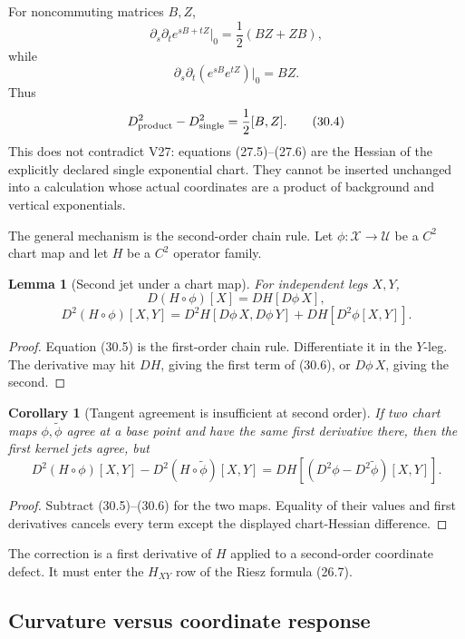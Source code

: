 \documentclass[11pt]{article}
\newtheorem{lemma}[theorem]{Lemma}
\newtheorem{corollary}[theorem]{Corollary}
\begin{document}
For noncommuting matrices \(B,Z\),
\[
 \partial_s\partial_t e^{sB+tZ}\big|_{0}
 =\frac12(BZ+ZB),
 \tag{30.2}
\]
while
\[
 \partial_s\partial_t
 \left(e^{sB}e^{tZ}\right)\big|_{0}
 =BZ.
 \tag{30.3}
\]
Thus
\[
 D^2_{\rm product}-D^2_{\rm single}
 =\frac12[B,Z].
 \tag{30.4}
\]
This does not contradict V27: equations (27.5)--(27.6) are the Hessian
of the explicitly declared single exponential chart.  They cannot be
inserted unchanged into a calculation whose actual coordinates are a
product of background and vertical exponentials.

The general mechanism is the second-order chain rule.  Let
\(\phi:\mathcal X\to\mathcal U\) be a \(C^2\) chart map and let \(H\) be
a \(C^2\) operator family.

\begin{lemma}[Second jet under a chart map]
\label{lem:v11v30-chain}
For independent legs \(X,Y\),
\[
 D(H\circ\phi)[X]
 =
 DH[D\phi\,X],
 \tag{30.5}
\]
\[
 D^2(H\circ\phi)[X,Y]
 =
 D^2H[D\phi\,X,D\phi\,Y]
 +DH[D^2\phi[X,Y]].
 \tag{30.6}
\]
\end{lemma}

\begin{proof}
Equation (30.5) is the first-order chain rule.  Differentiate it in the
\(Y\)-leg.  The derivative may hit \(DH\), giving the first term of
(30.6), or \(D\phi\,X\), giving the second.
\end{proof}

\begin{corollary}[Tangent agreement is insufficient at second order]
\label{cor:v11v30-second-order}
If two chart maps \(\phi,\widetilde\phi\) agree at a base point and have
the same first derivative there, then the first kernel jets agree, but
\[
 D^2(H\circ\phi)[X,Y]
 -D^2(H\circ\widetilde\phi)[X,Y]
 =
 DH\!\left[
 (D^2\phi-D^2\widetilde\phi)[X,Y]
 \right].
 \tag{30.7}
\]
\end{corollary}

\begin{proof}
Subtract (30.5)--(30.6) for the two maps.  Equality of their values and
first derivatives cancels every term except the displayed chart-Hessian
difference.
\end{proof}

The correction is a first derivative of \(H\) applied to a second-order
coordinate defect.  It must enter the \(H_{XY}\) row of the Riesz formula
(26.7).

\subsection{Curvature versus coordinate response}
\end{document}
